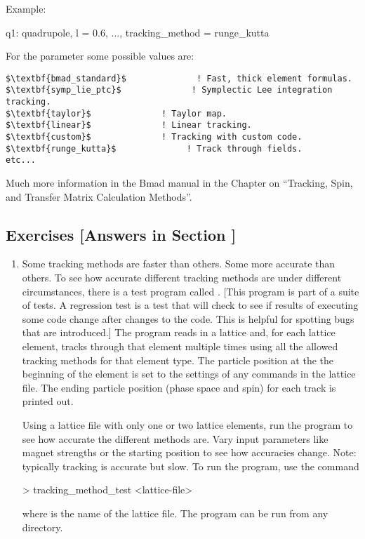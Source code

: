 \documentclass{hitec}     %
\begin{document}
{Example:
\begin{code}
q1: quadrupole, l = 0.6, ..., tracking_method = runge_kutta
\end{code}

For the  parameter some possible values are:
\begin{lstlisting}[mathescape]
$\textbf{bmad_standard}$              ! Fast, thick element formulas.
$\textbf{symp_lie_ptc}$              ! Symplectic Lee integration tracking.
$\textbf{taylor}$              ! Taylor map.
$\textbf{linear}$              ! Linear tracking.
$\textbf{custom}$              ! Tracking with custom code.
$\textbf{runge_kutta}$              ! Track through fields.
etc...
\end{lstlisting}

Much more information in the Bmad manual in the Chapter on ``Tracking, Spin, and Transfer Matrix
Calculation Methods''.

\subsection{Exercises [Answers in Section ]}
\label{s:methods.ex}

\begin{enumerate}[label=\thesection.\arabic{enumi}]
\item
Some tracking methods are faster than others. Some more accurate than others. To see how accurate
different tracking methods are under different circumstances, there is a test program called
. [This program is part of a suite of  tests. A regression
test is a test that will check to see if results of executing some code change after changes to the
code. This is helpful for spotting bugs that are introduced.] The  program
reads in a lattice and, for each lattice element, tracks through that element multiple times using
all the allowed tracking methods for that element type. The particle position at the the beginning
of the element is set to the settings of any  commands in the lattice file. The
ending particle position (phase space and spin) for each track is printed out.

Using a lattice file with only one or two lattice elements, run the 
program to see how accurate the different methods are. Vary input parameters like magnet strengths
or the starting position to see how accuracies change. Note: typically  tracking is
accurate but slow. To run the program, use the command
\begin{code}
  > tracking_method_test <lattice-file>
\end{code}
where  is the name of the lattice file. The program can be run from any directory.


\end{enumerate}}
\end{document}
